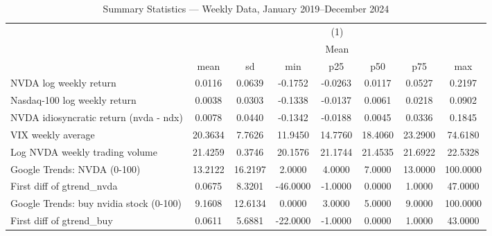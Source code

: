 \begin{table}[htbp]\centering
\def\sym#1{\ifmmode^{#1}\else\(^{#1}\)\fi}
\caption{Summary Statistics — Weekly Data, January 2019–December 2024}
\begin{tabular}{l*{1}{ccccccc}}
\toprule
                    &\multicolumn{7}{c}{(1)}                                                                   \\
                    &\multicolumn{7}{c}{Mean}                                                                  \\
                    &        mean&          sd&         min&         p25&         p50&         p75&         max\\
\midrule
NVDA log weekly return&      0.0116&      0.0639&     -0.1752&     -0.0263&      0.0117&      0.0527&      0.2197\\
Nasdaq-100 log weekly return&      0.0038&      0.0303&     -0.1338&     -0.0137&      0.0061&      0.0218&      0.0902\\
NVDA idiosyncratic return (nvda - ndx)&      0.0078&      0.0440&     -0.1342&     -0.0188&      0.0045&      0.0336&      0.1845\\
VIX weekly average  &     20.3634&      7.7626&     11.9450&     14.7760&     18.4060&     23.2900&     74.6180\\
Log NVDA weekly trading volume&     21.4259&      0.3746&     20.1576&     21.1744&     21.4535&     21.6922&     22.5328\\
Google Trends: NVDA (0-100)&     13.2122&     16.2197&      2.0000&      4.0000&      7.0000&     13.0000&    100.0000\\
First diff of gtrend\_nvda&      0.0675&      8.3201&    -46.0000&     -1.0000&      0.0000&      1.0000&     47.0000\\
Google Trends: buy nvidia stock (0-100)&      9.1608&     12.6134&      0.0000&      3.0000&      5.0000&      9.0000&    100.0000\\
First diff of gtrend\_buy&      0.0611&      5.6881&    -22.0000&     -1.0000&      0.0000&      1.0000&     43.0000\\
\bottomrule
\end{tabular}
\end{table}
